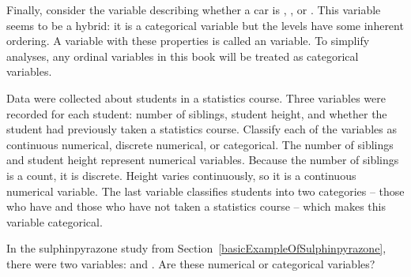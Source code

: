Finally, consider the  variable describing whether a car is , , or . This variable seems to be a hybrid: it is a categorical variable but the levels have some inherent ordering. A variable with these properties is called an  variable. To simplify analyses, any ordinal variables in this book will be treated as categorical variables.


\begin{example}{Data were collected about students in a statistics course. Three variables were recorded for each student: number of siblings, student height, and whether the student had previously taken a statistics course. Classify each of the variables as continuous numerical, discrete numerical, or categorical.}
The number of siblings and student height represent numerical variables. Because the number of siblings is a count, it is discrete. Height varies continuously, so it is a continuous numerical variable. The last variable classifies students into two categories -- those who have and those who have not taken a statistics course -- which makes this variable categorical.
\end{example}

\begin{exercise}
In the sulphinpyrazone study from Section~\ref{basicExampleOfSulphinpyrazone}, there were two variables:  and . Are these numerical or categorical variables?
\end{exercise}




